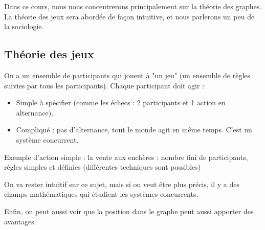 Dans ce cours, nous nous concentrerons principalement sur la théorie des graphes. La théorie des jeux sera abordée de façon intuitive, et nous parlerons un peu de la sociologie.

\subsection{Théorie des jeux}
On a un ensemble de participants qui jouent à "un jeu" (un ensemble de règles suivies par tous les participants). Chaque participant doit agir : 

\begin{itemize}
\item Simple à spécifier (comme les échecs : 2 participants et 1 action en alternance). 
\item Compliqué : pas d'alternance, tout le monde agit en même temps. C'est un système concurrent.
\end{itemize}

Exemple d'action simple : la vente aux enchères : 
	nombre fini de participants,
	règles simples et définies (différentes techniques sont possibles)
	
\vspace{1cm}

On va rester intuitif sur ce sujet, mais si on veut être plus précis, il y a des champs mathématiques qui étudient les systèmes concurrents.

Enfin, on peut aussi voir que la position dans le graphe peut aussi apporter des avantages.

